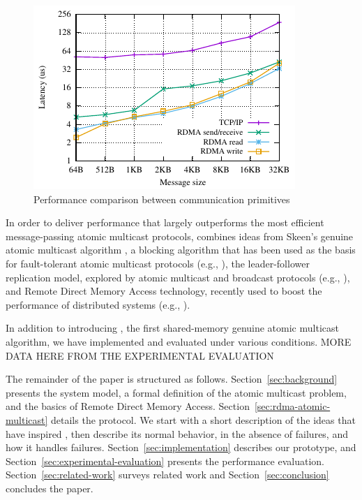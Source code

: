 \begin{figure}[htp!]
    \centering
    \includegraphics[width=0.99\columnwidth]{figures/benchmark/graphs/figure-protocol-bench.pdf}
  \caption{Performance comparison between communication primitives}
  \label{fig:perfcomp}
\end{figure}

In order to deliver performance that largely outperforms the most efficient message-passing atomic multicast protocols, \libname combines ideas from Skeen's genuine atomic multicast algorithm \cite{BJ87b}, a blocking algorithm that has been used as the basis for fault-tolerant atomic multicast protocols (e.g., \cite{Coelho2017,gotsman2019white}), the leader-follower replication model, explored by atomic multicast and broadcast protocols (e.g., \cite{gotsman2019white,Junqueira2011,Mu}), and Remote Direct Memory Access technology, recently used to boost the performance of distributed systems (e.g., \cite{Aguilera2019,kalia2014using, kalia2016design, mitchell2013using}).

In addition to introducing \libname, the first shared-memory genuine atomic multicast algorithm, we have implemented and evaluated \libname under various conditions. 
MORE DATA HERE FROM THE EXPERIMENTAL EVALUATION

The remainder of the paper is structured as follows.
Section~\ref{sec:background} presents the system model, a formal definition of the atomic multicast problem, and the basics of Remote Direct Memory Access.
Section~\ref{sec:rdma-atomic-multicast} details the \libname protocol.
We start with a short description of the ideas that have inspired \libname, then describe its normal behavior, in the absence of failures, and how it handles failures.
Section~\ref{sec:implementation} describes our prototype, and Section~\ref{sec:experimental-evaluation} presents the performance evaluation.
Section~\ref{sec:related-work} surveys related work and Section~\ref{sec:conclusion} concludes the paper.

